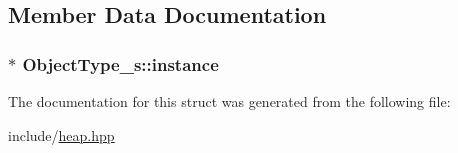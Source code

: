 \subsection{Member Data Documentation}
\hypertarget{structObjectType__s_ace1fa4b359f32f92954516a5de896350}{
\subsubsection[{instance}]{$\ast$ Object\+Type\+\_\+s\+::instance}}\label{structObjectType__s_ace1fa4b359f32f92954516a5de896350}


The documentation for this struct was generated from the following file\+:\begin{DoxyCompactItemize}
\item 
include/\hyperlink{heap_8hpp}{heap.\+hpp}\end{DoxyCompactItemize}
